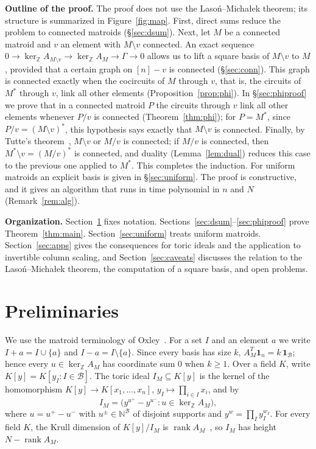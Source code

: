 \documentclass[11pt,a4paper]{article}
\theoremstyle{plain}
\theoremstyle{definition}
\newcommand{\Z}{\mathbb Z}
\newcommand{\N}{\mathbb N}
\newcommand{\AM}{A_M}
\newcommand{\kerZ}{\ker_{\Z}\!A_M}
\newcommand{\bs}{\mathcal B}
\newcommand{\rank}{\operatorname{rank}}
\newcommand{\ind}{\mathbf 1}
\newcommand{\LM}{Laso\'n--Micha\l{}ek}
\begin{document}
\medskip\noindent\textbf{Outline of the proof.} The proof does not use the \LM{} theorem; its structure is summarized in Figure~\ref{fig:map}. First, direct sums reduce the problem to connected matroids (\S\ref{sec:dsum}). Next, let $M$ be a connected matroid and $v$ an element with $M\setminus v$ connected. An exact sequence $0\to\ker_\Z A_{M\setminus v}\to\kerZ\to\Gamma\to0$ allows us to lift a square basis of $M\setminus v$ to $M$, provided that a certain graph on $[n]-v$ is connected (\S\ref{sec:conn}). This graph is connected exactly when the cocircuits of $M$ through $v$, that is, the circuits of $M^*$ through $v$, link all other elements (Proposition~\ref{prop:phi}). In \S\ref{sec:phiproof} we prove that in a connected matroid $P$ the circuits through $v$ link all other elements whenever $P/v$ is connected (Theorem~\ref{thm:phi}); for $P=M^*$, since $P/v=(M\setminus v)^*$, this hypothesis says exactly that $M\setminus v$ is connected. Finally, by Tutte's theorem~\cite[Section~4.3]{Ox11}, $M\setminus v$ or $M/v$ is connected; if $M/v$ is connected, then $M^*\setminus v=(M/v)^*$ is connected, and duality (Lemma~\ref{lem:dual}) reduces this case to the previous one applied to $M^*$. This completes the induction. For uniform matroids an explicit basis is given in \S\ref{sec:uniform}. The proof is constructive, and it gives an algorithm that runs in time polynomial in $n$ and $N$ (Remark~\ref{rem:alg}).

\medskip\noindent\textbf{Organization.} Section~\ref{sec:prelim} fixes notation. Sections~\ref{sec:dsum}--\ref{sec:phiproof} prove Theorem~\ref{thm:main}. Section~\ref{sec:uniform} treats uniform matroids. Section~\ref{sec:apps} gives the consequences for toric ideals and the application to invertible column scaling, and Section~\ref{sec:caveats} discusses the relation to the \LM{} theorem, the computation of a square basis, and open problems.

\section{Preliminaries}\label{sec:prelim}
We use the matroid terminology of Oxley~\cite{Ox11}. For a set $I$ and an element $a$ we write $I+a=I\cup\{a\}$ and $I-a=I\setminus\{a\}$. Since every basis has size $k$, $\AM^{T}\ind_n=k\,\ind_{\bs}$; hence every $u\in\kerZ$ has coordinate sum $0$ when $k\ge1$. Over a field $K$, write $K[y]=K[y_I:I\in\bs]$. The toric ideal $I_M\subseteq K[y]$ is the kernel of the homomorphism $K[y]\to K[x_1,\dots,x_n]$, $y_I\mapsto\prod_{i\in I}x_i$, and by~\cite{St96}
\[
I_M=\big(y^{u^+}-y^{u^-}:u\in\kerZ\big),
\]
where $u=u^+-u^-$ with $u^\pm\in\N^{\bs}$ of disjoint supports and $y^w=\prod_Iy_I^{w_I}$. For every field $K$, the Krull dimension of $K[y]/I_M$ is $\rank\AM$~\cite{St96}, so $I_M$ has height $N-\rank\AM$.
\end{document}
